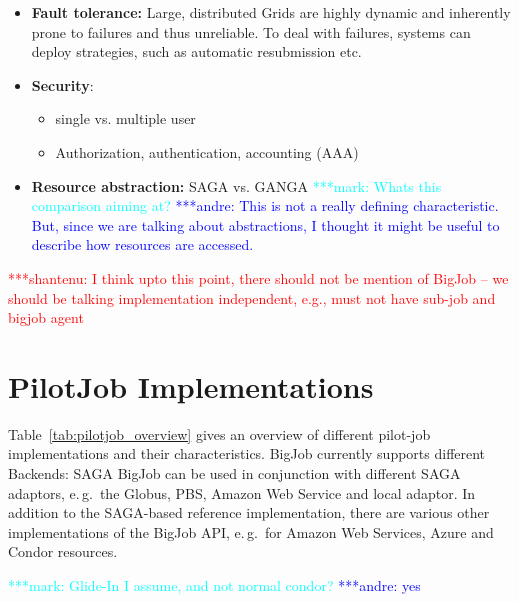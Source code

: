\documentclass[]{article}
\newcommand{\jhanote}[1]{ {\textcolor{red} { ***shantenu: #1 }}}
\newcommand{\alnote}[1]{ {\textcolor{blue} { ***andre: #1 }}}
\newcommand{\msnote}[1]{ {\textcolor{cyan} { ***mark: #1 }}}
\newcommand{\alnote}[1]{}
\begin{document}
\begin{itemize}
	\item \textbf{Fault tolerance:} Large, distributed Grids are highly dynamic 
	and inherently prone to failures and thus unreliable. To deal with failures, 
	systems can deploy strategies, such as automatic resubmission etc.
	\item \textbf{Security}: 
	\begin{itemize}
	   \item single vs. multiple user
	   \item Authorization, authentication, accounting (AAA)
	\end{itemize}
	\item \textbf{Resource abstraction:} SAGA vs. GANGA
	\msnote{Whats this comparison aiming at?} \alnote{This is not a really 
	defining characteristic. But, since we are talking about abstractions, I 
	thought it might be useful to describe how resources are accessed.}
\end{itemize}

\jhanote{I think upto this point, there should not be mention of
  BigJob -- we should be talking implementation independent, e.g., must
  not have sub-job and bigjob agent}




\section{PilotJob Implementations}

Table~\ref{tab:pilotjob_overview} gives an overview of different pilot-job
implementations and their characteristics. BigJob currently supports different
Backends: SAGA BigJob can be used in conjunction with different SAGA adaptors,
e.\,g.\ the Globus, PBS, Amazon Web Service and local adaptor. In addition to
the SAGA-based reference implementation, there are various other implementations
of the BigJob API, e.\,g.\ for Amazon Web Services, Azure and Condor resources.


\msnote{Glide-In I assume, and not normal condor?}\alnote{yes}
\end{document}
